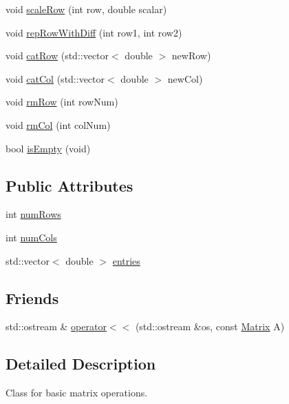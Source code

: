 \begin{DoxyCompactItemize}
\item 
void \mbox{\hyperlink{class_matrix_a37dba2b6d455b7d44ced045ce97a9e05}{scale\+Row}} (int row, double scalar)
\item 
void \mbox{\hyperlink{class_matrix_a1385f13513c2f00cf9dbe9eb45ccbc01}{rep\+Row\+With\+Diff}} (int row1, int row2)
\item 
void \mbox{\hyperlink{class_matrix_a8e3776c15fa1abfd2ffcbd593098131f}{cat\+Row}} (std\+::vector$<$ double $>$ new\+Row)
\item 
void \mbox{\hyperlink{class_matrix_a1d288589b025eb2dad477b9699a79e9f}{cat\+Col}} (std\+::vector$<$ double $>$ new\+Col)
\item 
void \mbox{\hyperlink{class_matrix_aab389448930cfd4b32158aa58ef5f87a}{rm\+Row}} (int row\+Num)
\item 
void \mbox{\hyperlink{class_matrix_ac47f9d15d021312e0a33a341cc1e8032}{rm\+Col}} (int col\+Num)
\item 
bool \mbox{\hyperlink{class_matrix_a8001c85cc9d6a706e659f972ea35ff93}{is\+Empty}} (void)
\end{DoxyCompactItemize}
\subsection*{Public Attributes}
\begin{DoxyCompactItemize}
\item 
int \mbox{\hyperlink{class_matrix_a0eb658c64c749da9cc9705dc232fcb85}{num\+Rows}}
\item 
int \mbox{\hyperlink{class_matrix_a1ddb385f8482c80f98e5cdbf914ba11a}{num\+Cols}}
\item 
std\+::vector$<$ double $>$ \mbox{\hyperlink{class_matrix_aac8f997f1cfa7b0a0ed1d11b554a8c24}{entries}}
\end{DoxyCompactItemize}
\subsection*{Friends}
\begin{DoxyCompactItemize}
\item 
std\+::ostream \& \mbox{\hyperlink{class_matrix_ac7214274c9ef83ebef022af7225ac068}{operator$<$$<$}} (std\+::ostream \&os, const \mbox{\hyperlink{class_matrix}{Matrix}} A)
\end{DoxyCompactItemize}


\subsection{Detailed Description}
Class for basic matrix operations. 

